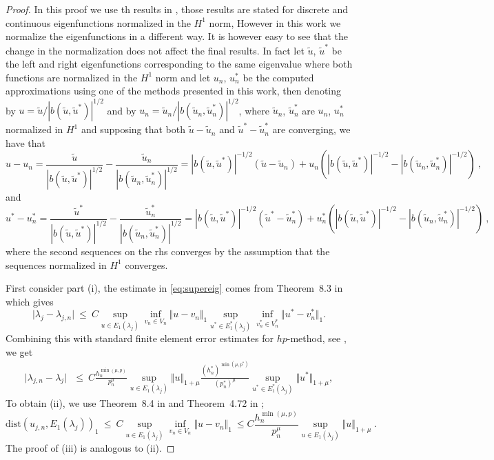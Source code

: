 \documentclass[smallextended]{svjour3}
\begin{document}
\begin{proof}

In this proof we use th results in \cite{babuska}, those results are stated for discrete and continuous eigenfunctions normalized in the $H^1$ norm, However in this work we normalize the eigenfunctions in a different way. It is however easy to see that the change in the normalization does not affect the final results. In fact let $\tilde u$, $\tilde u^*$ be the left and right eigenfunctions corresponding to the same eigenvalue where both functions are normalized in the $H^1$ norm and let $u_n$, $u_n^*$ be the computed approximations using one of the methods presented in this work, 
then
 denoting by $ u = \tilde u /|b(\tilde u,\tilde u^*)|^{1/2}$ and by 
$ u_n = \tilde u_n/|b(\tilde u_n,\tilde u_n^*)|^{1/2}$, where $\tilde u_n$, $\tilde u_n^*$ are $u_n$, $u_n^*$ normalized in $H^1$  and supposing that both $\tilde u-\tilde u_n$ and $\tilde u^*-\tilde u_n^*$ are converging, we have that
$$
u - u_n = \frac{\tilde u}{|b(\tilde u,\tilde u^*)|^{1/2}}-\frac{\tilde u_n}{|b(\tilde u_n,\tilde u_n^*)|^{1/2}} =
|b(\tilde u,\tilde u^*)|^{-1/2}(\tilde u-\tilde u_n)+ u_n( |b(\tilde u,\tilde u^*)|^{-1/2}- |b(\tilde u_n,\tilde u_n^*)|^{-1/2})\ ,
$$
and
$$
u^* - u_n^* = \frac{\tilde u^*}{|b(\tilde u,\tilde u^*)|^{1/2}}-\frac{\tilde u_n^*}{|b(\tilde u_n,\tilde u_n^*)|^{1/2}} =
|b(\tilde u,\tilde u^*)|^{-1/2}(\tilde u^*-\tilde u_n^*)+ u_n^*( |b(\tilde u,\tilde u^*)|^{-1/2}- |b(\tilde u_n,\tilde u_n^*)|^{-1/2})\ ,
$$
where the second sequences on the rhs converges by the assumption that the sequences normalized in $H^1$ converges.


First consider part (i), the estimate in \eqref{eq:supereig} comes from  
Theorem~8.3 in \cite{babuska} which gives  
$$ 
\vert \lambda_j - \lambda_{j,n} \vert \ \leq \  C \sup_{u \in
  E_1(\lambda_j)} \inf_{v_n \in V_n} \Vert u - v_n \Vert_1 \sup_{u^* \in
  E_1^*(\lambda_j)} \inf_{v_n^* \in V_n^*} \Vert u^* - v_n^* \Vert_1. 
  $$
Combining this with standard finite element error
estimates for $hp$-method, see \cite[Theorem~4.72]{schwab}, we get  
\begin{eqnarray}
\vert \lambda_{j,n} - \lambda_j \vert \  \  
\ \leq \ C \frac{h_n^{\min(\mu,p)} }{p_n^{\mu}} \sup_{u \in
  E_1(\lambda_j)} \Vert u \Vert_{1+\mu}\frac{(h_n^*)^{\min(\mu,p^*)} }{(p_n^*)^{\mu}} \sup_{u^* \in
  E_1^*(\lambda_j)} \Vert u^* \Vert_{1+\mu} ,  \label{eq:second_est} 
  \end{eqnarray}
To obtain  (ii), we use Theorem~8.4 in \cite{babuska} and Theorem~4.72 in \cite{schwab};
$$
\mathrm{dist}(
u_{j,n},E_1(\lambda_j))_{1}\ \leq \  C \sup_{u \in
  E_1(\lambda_j)} \inf_{v_n \in V_n} \Vert u - v_n \Vert_1 \ \leq
C \frac{h_n^{\min(\mu,p)} }{p_n^{\mu}} \sup_{u \in
  E_1(\lambda_j)} \Vert u \Vert_{1+\mu}\ .
$$
The proof of (iii) is analogous to (ii).
\end{proof}
\end{document}
